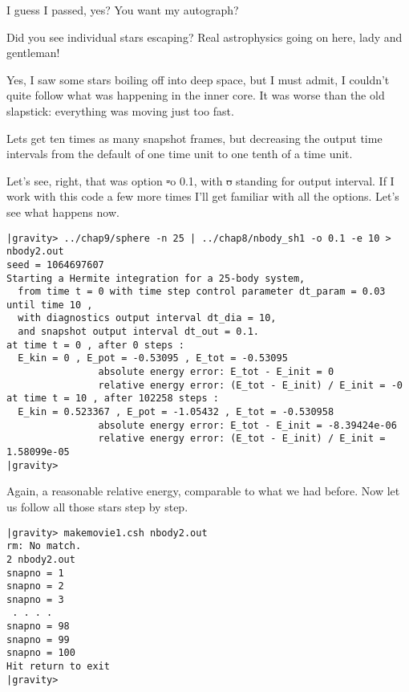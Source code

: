 \clearpage  %

\abc

\carol
I guess I passed, yes?  You want my autograph?

\alice
Did you see individual stars escaping?  Real astrophysics going on
here, lady and gentleman!

\bob
Yes, I saw some stars boiling off into deep space, but I must admit, I
couldn't quite follow what was happening in the inner core.  It was
worse than the old slapstick: everything was moving just too fast.

\carol
Lets get ten times as many snapshot frames, but decreasing the output
time intervals from the default of one time unit to one tenth of a
time unit.

\bob
Let's see, right, that was option {\st -o 0.1}, with {\st o} standing
for output interval.  If I work with this code a few more times I'll
get familiar with all the options.  Let's see what happens now.

\cba

\begin{small}
\begin{verbatim}
|gravity> ../chap9/sphere -n 25 | ../chap8/nbody_sh1 -o 0.1 -e 10 > nbody2.out
seed = 1064697607
Starting a Hermite integration for a 25-body system,
  from time t = 0 with time step control parameter dt_param = 0.03  until time 10 ,
  with diagnostics output interval dt_dia = 10,
  and snapshot output interval dt_out = 0.1.
at time t = 0 , after 0 steps :
  E_kin = 0 , E_pot = -0.53095 , E_tot = -0.53095
                absolute energy error: E_tot - E_init = 0
                relative energy error: (E_tot - E_init) / E_init = -0
at time t = 10 , after 102258 steps :
  E_kin = 0.523367 , E_pot = -1.05432 , E_tot = -0.530958
                absolute energy error: E_tot - E_init = -8.39424e-06
                relative energy error: (E_tot - E_init) / E_init = 1.58099e-05
|gravity>
\end{verbatim}
\end{small}

\abc

\carol
Again, a reasonable relative energy, comparable to what we had before.
Now let us follow all those stars step by step.

\cba

\begin{small}
\begin{verbatim}
|gravity> makemovie1.csh nbody2.out
rm: No match.
2 nbody2.out
snapno = 1
snapno = 2
snapno = 3
 . . . .
snapno = 98
snapno = 99
snapno = 100
Hit return to exit
|gravity>
\end{verbatim}
\end{small}

